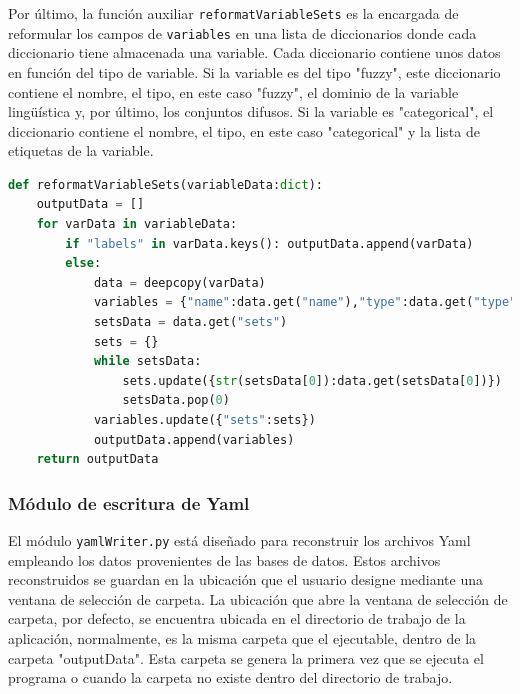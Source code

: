Por último, la función auxiliar \texttt{reformatVariableSets} es la encargada de reformular los campos de \texttt{variables} en una lista de diccionarios donde cada diccionario tiene almacenada una variable. Cada diccionario contiene unos datos en función del tipo de variable. Si la variable es del tipo "fuzzy", este diccionario contiene el nombre, el tipo, en este caso "fuzzy", el dominio de la variable lingüística y, por último, los conjuntos difusos. Si la variable es "categorical", el diccionario contiene el nombre, el tipo, en este caso "categorical" y la lista de etiquetas de la variable.

\begin{lstlisting}[language=Python,
                   style=python,
                   frame=none,
                   numbers=none,
                   basicstyle=\ttfamily\normalsize,
                   caption={Función \texttt{reformatVariableSets}},
                   label=src:functionReformatVariableSets,
                   inputencoding=utf8]                   
def reformatVariableSets(variableData:dict):
    outputData = []
    for varData in variableData:
        if "labels" in varData.keys(): outputData.append(varData)
        else:
            data = deepcopy(varData)
            variables = {"name":data.get("name"),"type":data.get("type"),"support":data.get("support")}
            setsData = data.get("sets")
            sets = {}
            while setsData:
                sets.update({str(setsData[0]):data.get(setsData[0])})
                setsData.pop(0)
            variables.update({"sets":sets})
            outputData.append(variables)
    return outputData
\end{lstlisting}



\subsubsection{Módulo de escritura de Yaml}

El módulo \texttt{yamlWriter.py} está diseñado para reconstruir los archivos \acrshort{Yaml} empleando los datos provenientes de las bases de datos. Estos archivos reconstruidos se guardan en la ubicación que el usuario designe mediante una ventana de selección de carpeta. La ubicación que abre la ventana de selección de carpeta, por defecto, se encuentra ubicada en el directorio de trabajo de la aplicación, normalmente, es la misma carpeta que el ejecutable, dentro de la carpeta "outputData". Esta carpeta se genera la primera vez que se ejecuta el programa o cuando la carpeta no existe dentro del directorio de trabajo.

